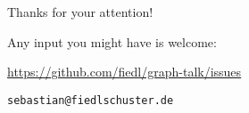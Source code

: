 
\begin{frame}{Thanks for your attention!}
  \begin{center}
    Any input you might have is welcome: \\ \vspace{0.3cm}

    \url{https://github.com/fiedl/graph-talk/issues} \\ \vspace{0.5cm}

    \texttt{sebastian@fiedlschuster.de}

    \vspace{1.5cm}

  \end{center}
\end{frame}
